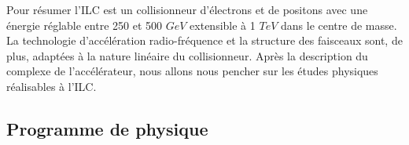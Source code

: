   
  \medskip
  
  Pour r\'esumer l'ILC est un collisionneur d'\'electrons et de positons avec une \'energie r\'eglable entre 250 et 500 $GeV$ extensible \`a 1 $TeV$ dans le centre de masse. La technologie d'acc\'el\'eration radio-fr\'equence et la structure des faisceaux sont, de plus, adapt\'ees \`a la nature lin\'eaire du collisionneur. Apr\`es la description du complexe de l'acc\'el\'erateur, nous allons nous pencher sur les \'etudes physiques r\'ealisables \`a l'ILC. 
  
  
    
  \subsection{Programme de physique}
  \label{sect:prog_physique}

